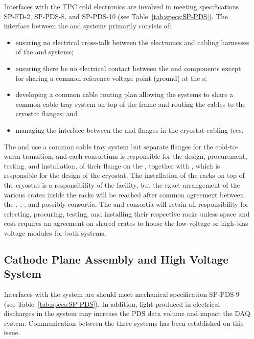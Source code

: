 Interfaces with the TPC cold electronics are involved in meeting specifications SP-FD-2, SP-PDS-8, and SP-PDS-10 (see Table~\ref{tab:specs:SP-PDS}).  The interface between the  and  systems primarily consists of:

\begin{itemize}
    
    \item ensuring no electrical cross-talk between the electronics and cabling harnesses of the  and  systems;
    \item ensuring there be no electrical contact between the  and  components except for sharing a common reference voltage point (ground) at the \fdth{}s;
    \item developing a common cable routing plan allowing the systems to share a common cable tray system on top of the  frame and routing the cables to the cryostat flanges; and 
    \item managing the interface between the  and  flanges in the cryostat cabling tees.
  \end{itemize}  
The  and  use a common cable tray system but separate flanges for the cold-to-warm transition, and each consortium is responsible for the design, procurement, testing, and installation, of their flange on the \fdth{}, together with , which is responsible for the design of the cryostat. 
The installation of the racks on top of the cryostat is a responsibility of the facility, but the exact arrangement of the various crates inside the racks will be reached after common agreement between the , , , and possibly  consortia. 
The  and  consortia will retain all responsibility for selecting, procuring, testing, and installing their respective racks unless space and cost requires an agreement on shared crates to house the low-voltage or high-bias voltage modules for both systems. 

\subsection{Cathode Plane Assembly and High Voltage System}
\label{sec:fdsp-pd-intfc-le}


Interfaces with the  system are should meet mechanical specification SP-PDS-9 (see Table~\ref{tab:specs:SP-PDS}). In addition, light produced in electrical discharges in the  system may increase the PDS data volume and impact the DAQ system. Communication between the three systems has been established on this issue. 

